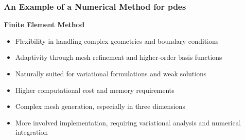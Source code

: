 \begin{frame}
    \frametitle{An Example of a Numerical Method for \acrshort{pdes}}

    \vspace*{\fill}
    \begin{center}
        {\color{\accentcolor} \Large \textbf{Finite Element Method}}
    \end{center}

    \vspace*{0.125cm}

    \begin{center}
        \begin{minipage}{0.75\textwidth}
            \begin{itemize}
                \color{\procolor}
                \item Flexibility in handling complex geometries and boundary conditions
                \item Adaptivity through mesh refinement and higher-order basis functions
                \item Naturally suited for variational formulations and weak solutions
            \end{itemize}

            \begin{itemize}
                \color{\concolor}
                \item Higher computational cost and memory requirements
                \item Complex mesh generation, especially in three dimensions
                \item More involved implementation, requiring variational analysis and numerical integration
            \end{itemize}
        \end{minipage}
    \end{center}
    \vspace*{\fill}
    
\end{frame}